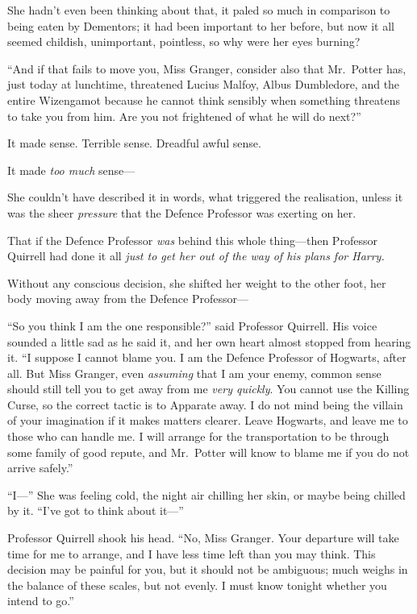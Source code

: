 She hadn't even been thinking about that, it paled so much in comparison
to being eaten by Dementors; it had been important to her before, but
now it all seemed childish, unimportant, pointless, so why were her eyes
burning?

``And if that fails to move you, Miss Granger, consider also that
Mr.~Potter has, just today at lunchtime, threatened Lucius Malfoy, Albus
Dumbledore, and the entire Wizengamot because he cannot think sensibly
when something threatens to take you from him. Are you not frightened of
what he will do next?''

It made sense. Terrible sense. Dreadful awful sense.

It made \emph{too much} sense---

She couldn't have described it in words, what triggered the realisation,
unless it was the sheer \emph{pressure} that the Defence Professor was
exerting on her.

That if the Defence Professor \emph{was} behind this whole thing---then
Professor Quirrell had done it all \emph{just to get her out of the way
of his plans for Harry.}

Without any conscious decision, she shifted her weight to the other
foot, her body moving away from the Defence Professor---

``So you think I am the one responsible?'' said Professor Quirrell. His
voice sounded a little sad as he said it, and her own heart almost
stopped from hearing it. ``I suppose I cannot blame you. I am the
Defence Professor of Hogwarts, after all. But Miss Granger, even
\emph{assuming} that I am your enemy, common sense should still tell you
to get away from me \emph{very quickly}. You cannot use the Killing
Curse, so the correct tactic is to Apparate away. I do not mind being
the villain of your imagination if it makes matters clearer. Leave
Hogwarts, and leave me to those who can handle me. I will arrange for
the transportation to be through some family of good repute, and
Mr.~Potter will know to blame me if you do not arrive safely.''

``I---'' She was feeling cold, the night air chilling her skin, or maybe
being chilled by it. ``I've got to think about it---''

Professor Quirrell shook his head. ``No, Miss Granger. Your departure
will take time for me to arrange, and I have less time left than you may
think. This decision may be painful for you, but it should not be
ambiguous; much weighs in the balance of these scales, but not evenly. I
must know tonight whether you intend to go.''

